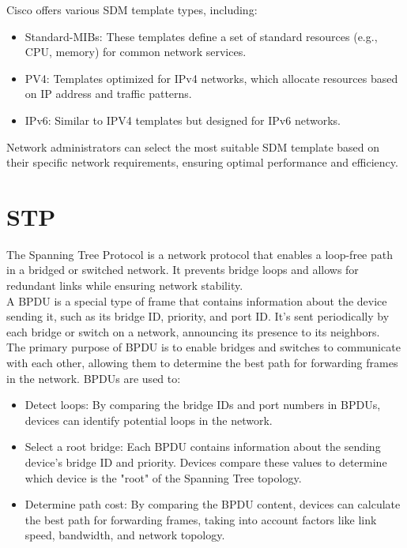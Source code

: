 \documentclass{article}
\begin{document}
Cisco offers various SDM template types, including:
	\begin{itemize}
		\item  Standard-MIBs: These templates define a set of standard resources (e.g., CPU, memory) for common network services.
		\item PV4: Templates optimized for IPv4 networks, which allocate resources based on IP address and traffic patterns. 
		\item IPv6: Similar to IPV4 templates but designed for IPv6 networks. 
	\end{itemize}

Network administrators can select the most suitable SDM template based on their specific network requirements, ensuring optimal performance and efficiency.\\

\section*{STP}
The Spanning Tree Protocol is a network protocol that enables a loop-free path in a bridged or switched network. It prevents bridge loops and allows for redundant links while ensuring network stability.\\

A BPDU is a special type of frame that contains information about the device sending it, such as its bridge ID, priority, and port ID. It's sent periodically by each bridge or switch on a network, announcing its presence to its neighbors.\\

The primary purpose of BPDU is to enable bridges and switches to communicate with each other, allowing them to determine the best path for forwarding frames in the network. BPDUs are used to:
	\begin{itemize}
		\item Detect loops: By comparing the bridge IDs and port numbers in BPDUs, devices can identify potential loops in the network.
		\item Select a root bridge: Each BPDU contains information about the sending device's bridge ID and priority. Devices compare these values to determine which device is the "root" of the Spanning Tree topology.
		\item Determine path cost: By comparing the BPDU content, devices can calculate the best path for forwarding frames, taking into account factors like link speed, bandwidth, and network topology.
	\end{itemize}
\end{document}
